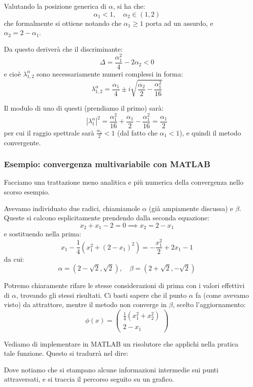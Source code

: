 \documentclass[a4paper,11pt]{article}
\begin{document}
Valutando la posizione generica di $\alpha$, si ha che:
$$
\alpha_1 < 1, \quad \alpha_2 \in (1, 2)
$$
che formalmente si ottiene notando che $\alpha_1 \geq 1$ porta ad un assurdo, e $\alpha_2 = 2 - \alpha_1$.

Da questo deriverà che il discriminante:
$$
\Delta = \frac{\alpha_1^2}{4} - 2 \alpha_2 < 0
$$
e cioè $\lambda_{1, 2}^\alpha$ sono necessariamente numeri complessi in forma:
$$
\lambda_{1, 2}^\alpha = \frac{\alpha_1}{4} \pm i \sqrt{ \frac{\alpha_2}{2} - \frac{\alpha_1^2}{16} }
$$

Il modulo di uno di questi (prendiamo il primo) sarà:
$$
|\lambda_1^\alpha|^2 = \frac{\alpha_1^2}{16} + \frac{\alpha_1}{2} - \frac{\alpha_1^2}{16} = \frac{\alpha_1}{2}
$$
per cui il raggio spettrale sarà $\frac{\alpha_1}{2} < 1$ (dal fatto che $\alpha_1 < 1$), e quindi il metodo convergente.

\subsubsection{Esempio: convergenza multivariabile con MATLAB}
Facciamo una trattazione meno analitica e più numerica della convergenza nello scorso esempio.

Avevamo individuato due radici, chiamiamole $\alpha$ (già ampiamente discussa) e $\beta$.
Queste si calcono esplicitamente prendendo dalla seconda equazione:
$$
x_2 + x_1 - 2 = 0 \implies x_2 = 2 - x_1
$$
e sostituendo nella prima:
$$
x_1 - \frac{1}{4} (x_1^2 + (2 - x_1)^2) = -\frac{x_1^2}{2} + 2 x_1 - 1
$$
da cui:
$$
\alpha = (2 - \sqrt{2}, \sqrt{2}), \quad \beta = (2 + \sqrt{2}, - \sqrt{2})
$$

Potremo chiaramente rifare le stesse considerazioni di prima con i valori effettivi di $\alpha$, trovando gli stessi risultati.
Ci basti sapere che il punto $\alpha$ fa (come avevamo visto) da attrattore, mentre il metodo non converge in $\beta$, scelto l'aggiornamento:
$$
\phi(x) =
\begin{pmatrix}
	\frac{1}{4} (x_1^2 + x_2^2) \\
	2 - x_1
\end{pmatrix}
$$

Vediamo di implementare in MATLAB un risolutore che applichi nella pratica tale funzione.
Questo si tradurrà nel dire:
\lstset{style=codestyle, language=MATLAB}


Dove notiamo che si stampano alcune informazioni intermedie sui punti attraversati, e si traccia il percorso seguito su un grafico.
\end{document}

